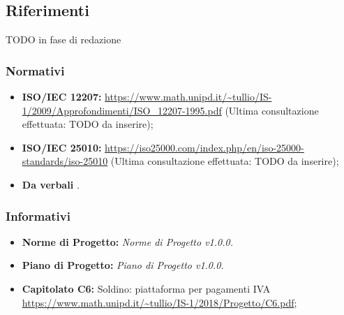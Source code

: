 \subsection{Riferimenti}

TODO in fase di redazione

\subsubsection{Normativi}
\begin{itemize}
	\item \textbf{ISO/IEC 12207:} \url{https://www.math.unipd.it/~tullio/IS-1/2009/Approfondimenti/ISO_12207-1995.pdf} (Ultima consultazione effettuata: TODO da inserire);
	\item \textbf{ISO/IEC 25010:} \url{https://iso25000.com/index.php/en/iso-25000-standards/iso-25010} (Ultima consultazione effettuata: TODO da inserire);
	\item \textbf{Da verbali} \emph{.}
\end{itemize}
\subsubsection{Informativi}
\begin{itemize}
	\item \textbf{Norme di Progetto:} \emph{Norme di Progetto v1.0.0.}
	\item \textbf{Piano di Progetto:} \emph{Piano di Progetto v1.0.0.}
	\item \textbf{Capitolato C6:} Soldino: piattaforma  per pagamenti IVA \\ \url{https://www.math.unipd.it/~tullio/IS-1/2018/Progetto/C6.pdf};
	
\end{itemize}
\pagebreak